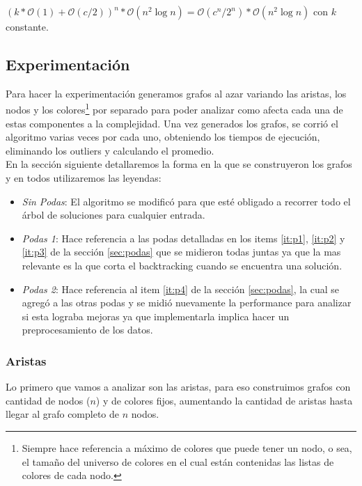 \begin{center}
$(k*\mathcal{O}(1) + \mathcal{O}(c/2))^n * \mathcal{O}(n^2 \log{n}) = \mathcal{O}(c^n/2^n) * \mathcal{O}(n^2 \log{n})$ con $k$ constante.
\end{center}

\subsection{Experimentación}
Para hacer la experimentación generamos grafos al azar variando las aristas, los nodos y los colores\footnote{Siempre hace referencia a máximo de colores que puede tener un nodo, o sea, el tamaño del universo de colores en el cual están contenidas las listas de colores de cada nodo.} por separado para poder analizar como afecta cada una de estas componentes a la complejidad. Una vez generados los grafos, se corrió el algoritmo varias veces por cada uno, obteniendo los tiempos de ejecución, eliminando los outliers y calculando el promedio.\\

En la sección siguiente detallaremos la forma en la que se construyeron los grafos y en todos utilizaremos las leyendas:
\begin{itemize}
	\item \emph{Sin Podas}: El algoritmo se modificó para que esté obligado a recorrer todo el árbol de soluciones para cualquier entrada.
	
	\item \emph{Podas 1}: Hace referencia a las podas detalladas en los items \ref{it:p1}, \ref{it:p2} y \ref{it:p3} de la sección \ref{sec:podas} que se midieron todas juntas ya que la mas relevante es la que corta el backtracking cuando se encuentra una solución.

	\item \emph{Podas 2}: Hace referencia al item \ref{it:p4} de la sección \ref{sec:podas}, la cual se agregó a las otras podas y se midió nuevamente la performance para analizar si esta lograba mejoras ya que implementarla implica hacer un preprocesamiento de los datos.
\end{itemize}

\subsubsection{Aristas}

Lo primero que vamos a analizar son las aristas, para eso construimos grafos con cantidad de nodos ($n$) y de colores fijos, aumentando la cantidad de aristas hasta llegar al grafo completo de $n$ nodos.

